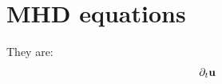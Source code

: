 \documentclass[11pt]{article}
\begin{document}
\doublespacing
\MOONSTITLE

\section{MHD equations}
They are:
\begin{equation}\begin{aligned}
\partial_t \mathbf{u}
\end{aligned} \end{equation}
\end{document}
